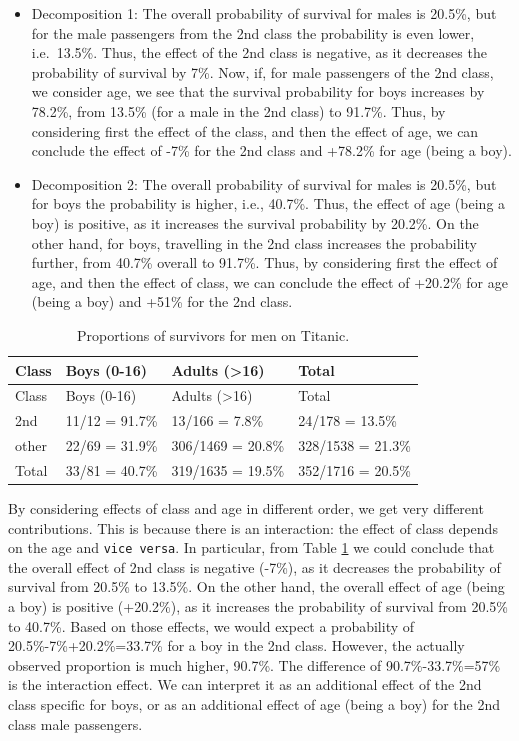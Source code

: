 \documentclass[12pt,]{krantz}
\begin{document}
\begin{itemize}
\item
  Decomposition 1: The overall probability of survival for males is 20.5\%, but for the male passengers from the 2nd class the probability is even lower, i.e.~13.5\%. Thus, the effect of the 2nd class is negative, as it decreases the probability of survival by 7\%. Now, if, for male passengers of the 2nd class, we consider age, we see that the survival probability for boys increases by 78.2\%, from 13.5\% (for a male in the 2nd class) to 91.7\%. Thus, by considering first the effect of the class, and then the effect of age, we can conclude the effect of -7\% for the 2nd class and +78.2\% for age (being a boy).
\item
  Decomposition 2: The overall probability of survival for males is 20.5\%, but for boys the probability is higher, i.e., 40.7\%. Thus, the effect of age (being a boy) is positive, as it increases the survival probability by 20.2\%. On the other hand, for boys, travelling in the 2nd class increases the probability further, from 40.7\% overall to 91.7\%. Thus, by considering first the effect of age, and then the effect of class, we can conclude the effect of +20.2\% for age (being a boy) and +51\% for the 2nd class.
\end{itemize}

\begin{longtable}[]{@{}llll@{}}
\caption{\label{tab:titanicMaleSurvival} Proportions of survivors for men on Titanic.}\tabularnewline
\toprule
Class & Boys (0-16) & Adults (\textgreater{}16) & Total\tabularnewline
\midrule
\endfirsthead
\toprule
Class & Boys (0-16) & Adults (\textgreater{}16) & Total\tabularnewline
\midrule
\endhead
2nd & 11/12 = 91.7\% & 13/166 = 7.8\% & 24/178 = 13.5\%\tabularnewline
other & 22/69 = 31.9\% & 306/1469 = 20.8\% & 328/1538 = 21.3\%\tabularnewline
Total & 33/81 = 40.7\% & 319/1635 = 19.5\% & 352/1716 = 20.5\%\tabularnewline
\bottomrule
\end{longtable}

By considering effects of class and age in different order, we get very different contributions. This is because there is an interaction: the effect of class depends on the age and \texttt{vice\ versa}. In particular, from Table \ref{tab:titanicMaleSurvival} we could conclude that the overall effect of 2nd class is negative (-7\%), as it decreases the probability of survival from 20.5\% to 13.5\%. On the other hand, the overall effect of age (being a boy) is positive (+20.2\%), as it increases the probability of survival from 20.5\% to 40.7\%. Based on those effects, we would expect a probability of 20.5\%-7\%+20.2\%=33.7\% for a boy in the 2nd class. However, the actually observed proportion is much higher, 90.7\%. The difference of 90.7\%-33.7\%=57\% is the interaction effect. We can interpret it as an additional effect of the 2nd class specific for boys, or as an additional effect of age (being a boy) for the 2nd class male passengers.
\end{document}
